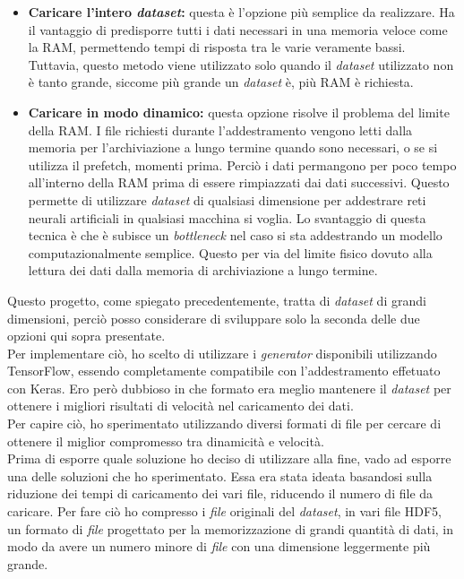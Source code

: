 \newpage

\begin{itemize}
    \item \textbf{Caricare l'intero \textit{dataset}:} questa è l'opzione più semplice da realizzare. Ha il vantaggio di predisporre tutti i dati necessari in una memoria veloce come la RAM, permettendo tempi di risposta tra le varie  veramente bassi. Tuttavia, questo metodo viene utilizzato solo quando il \textit{dataset} utilizzato non è tanto grande, siccome più grande un \textit{dataset} è, più RAM è richiesta.
    \item \textbf{Caricare in modo dinamico:} questa opzione risolve il problema del limite della RAM. I file richiesti durante l'addestramento vengono letti dalla memoria per l'archiviazione a lungo termine quando sono necessari, o se si utilizza il \gls{prefetch}, momenti prima. Perciò i dati permangono per poco tempo all'interno della RAM prima di essere rimpiazzati dai dati successivi. Questo permette di utilizzare \textit{dataset} di qualsiasi dimensione per addestrare reti neurali artificiali in qualsiasi macchina si voglia. Lo svantaggio di questa tecnica è che è subisce un \textit{bottleneck} nel caso si sta addestrando un modello computazionalmente semplice. Questo per via del limite fisico dovuto alla lettura dei dati dalla memoria di archiviazione a lungo termine.
\end{itemize}
Questo progetto, come spiegato precedentemente, tratta di \textit{dataset} di grandi dimensioni, perciò posso considerare di sviluppare solo la seconda delle due opzioni qui sopra presentate.\\
Per implementare ciò, ho scelto di utilizzare i \textit{generator} disponibili utilizzando TensorFlow, essendo completamente compatibile con l'addestramento effetuato con Keras. Ero però dubbioso in che formato era meglio mantenere il \textit{dataset} per ottenere i migliori risultati di velocità nel caricamento dei dati.\\
Per capire ciò, ho sperimentato utilizzando diversi formati di file per cercare di ottenere il miglior compromesso tra dinamicità e velocità.\\
Prima di esporre quale soluzione ho deciso di utilizzare alla fine, vado ad esporre una delle soluzioni che ho sperimentato.
Essa era stata ideata basandosi sulla riduzione dei tempi di caricamento dei vari file, riducendo il numero di file da caricare.
Per fare ciò ho compresso i \textit{file} originali del \textit{dataset}, in vari file HDF5, un formato di \textit{file} progettato per la memorizzazione di grandi quantità di dati, in modo da avere un numero minore di \textit{file} con una dimensione leggermente più grande.
